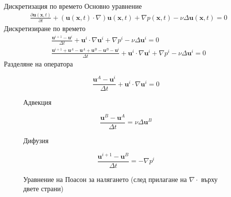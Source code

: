 \documentclass{beamer}
\newcommand{\vecf}[1]{\boldsymbol{#1}}
\begin{document}
    \begin{frame}{Дискретизация по времето}
    		\small
    		Основно уравнение
    		\begin{align*}
    			&\frac{\partial \vecf{u}(\vecf{x}, t)}{\partial t} + \left(\vecf{u}(\vecf{x}, t)\cdot\nabla\right)\vecf{u}(\vecf{x}, t) + \nabla p(\vecf{x}, t) - \nu\Delta\vecf{u}(\vecf{x}, t) = 0
    		\end{align*}
    		Дискретизиране по времето
    		\begin{align*}
			&\frac{\vecf{u}^{i+1} - \vecf{u}^{i}}{\Delta t} + \vecf{u}^i \cdot \nabla\vecf{u}^i + \nabla p^i - \nu \Delta \vecf{u}^i = 0 \\
			&\frac{\vecf{u}^{i+1} + \vecf{u}^A - \vecf{u}^A + \vecf{u}^B - \vecf{u}^B - \vecf{u}^{i}}{\Delta t} + \vecf{u}^i \cdot \nabla\vecf{u}^i + \nabla p^i - \nu \Delta \vecf{u}^i = 0
		\end{align*}
	Разделяне на оператора
\begin{figure}
\setlength{\belowdisplayskip}{0.5em} \setlength{\belowdisplayshortskip}{0.1em}
\setlength{\abovedisplayskip}{0.5em} \setlength{\abovedisplayshortskip}{0.1em}
  \begin{minipage}[c]{0.3\textwidth}
    $$\frac{\vecf{u}^A - \vecf{u}^i}{\Delta t} + \vecf{u}^i \cdot \nabla\vecf{u}^i = 0$$
  \end{minipage}\hfill
  \begin{minipage}[c]{0.67\textwidth}
  	\captionsetup{labelformat=empty}
    \caption{Адвекция} 
  \end{minipage}
  
    \begin{minipage}[c]{0.3\textwidth}
    $$\frac{\vecf{u}^B - \vecf{u}^A}{\Delta t} =\nu \Delta \vecf{u}^B$$
  \end{minipage}\hfill
  \begin{minipage}[c]{0.67\textwidth}
  	\captionsetup{labelformat=empty}
    \caption{Дифузия} 
  \end{minipage}
  \begin{minipage}[c]{0.3\textwidth}
    $$\frac{\vecf{u}^{i+1} - \vecf{u}^B}{\Delta t} = -\nabla p^i$$
  \end{minipage}\hfill
  \begin{minipage}[c]{0.67\textwidth}
  	\captionsetup{labelformat=empty}
    \caption{Уравнение на Поасон за налягането (след прилагане на $\nabla \cdot$ върху двете страни)} 
  \end{minipage}
\end{figure}
    \end{frame}
    
\end{document}
